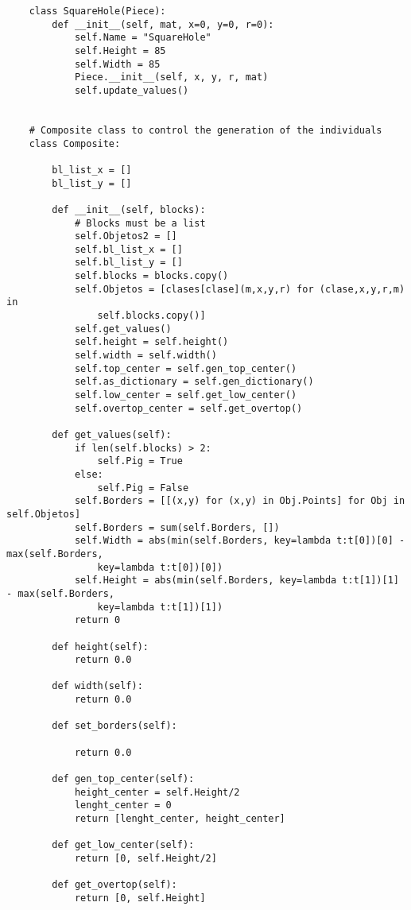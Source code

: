 \begin{verbatim}
    class SquareHole(Piece):
        def __init__(self, mat, x=0, y=0, r=0):
            self.Name = "SquareHole"
            self.Height = 85
            self.Width = 85
            Piece.__init__(self, x, y, r, mat)
            self.update_values()


    # Composite class to control the generation of the individuals
    class Composite:
        
        bl_list_x = []
        bl_list_y = []
        
        def __init__(self, blocks):
            # Blocks must be a list
            self.Objetos2 = []
            self.bl_list_x = []
            self.bl_list_y = []
            self.blocks = blocks.copy()
            self.Objetos = [clases[clase](m,x,y,r) for (clase,x,y,r,m) in 
                self.blocks.copy()]
            self.get_values()
            self.height = self.height()
            self.width = self.width()
            self.top_center = self.gen_top_center()
            self.as_dictionary = self.gen_dictionary()
            self.low_center = self.get_low_center()
            self.overtop_center = self.get_overtop()
            
        def get_values(self):
            if len(self.blocks) > 2:
                self.Pig = True
            else:
                self.Pig = False
            self.Borders = [[(x,y) for (x,y) in Obj.Points] for Obj in self.Objetos]
            self.Borders = sum(self.Borders, [])
            self.Width = abs(min(self.Borders, key=lambda t:t[0])[0] - max(self.Borders, 
                key=lambda t:t[0])[0])
            self.Height = abs(min(self.Borders, key=lambda t:t[1])[1] - max(self.Borders, 
                key=lambda t:t[1])[1])
            return 0

        def height(self):
            return 0.0

        def width(self):
            return 0.0
        
        def set_borders(self):
            
            return 0.0

        def gen_top_center(self):
            height_center = self.Height/2
            lenght_center = 0
            return [lenght_center, height_center]
        
        def get_low_center(self):
            return [0, self.Height/2]
        
        def get_overtop(self):
            return [0, self.Height]


\end{verbatim}

